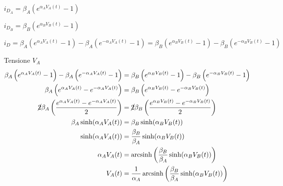 \documentclass[12pt,a4paper,twoside,english,italian]{book}
\DeclareMathOperator{\arcsinh}{arcsinh}
\begin{document}
		$i_{D_{A}} = \beta_{A}\left(e^{\alpha_{A}V_{A}(t)}-1\right)$
		
		$i_{D_{B}} = \beta_{B}\left(e^{\alpha_{B}V_{B}(t)}-1\right)$
		
		$i_{D} = \beta_{A}\left(e^{\alpha_{A}V_{A}(t)}-1\right)-\beta_{A}\left(e^{-\alpha_{A}V_{A}(t)}-1\right) = \beta_{B}\left(e^{\alpha_{B}V_{B}(t)}-1\right)-\beta_{B}\left(e^{-\alpha_{B}V_{B}(t)}-1\right)$
		\pagebreak
		
		Tensione $V_{A}$
		\begin{equation}
			\label{eq:corrente}
			\begin{split}
				\beta_{A}\left(e^{\alpha_{A}V_{A}(t)}-1\right)-\beta_{A}\left(e^{-\alpha_{A}V_{A}(t)}-1\right) &= \beta_{B}\left(e^{\alpha_{B}V_{B}(t)}-1\right)-\beta_{B}\left(e^{-\alpha_{B}V_{B}(t)}-1\right)\\
				\beta_{A}\left(e^{\alpha_{A}V_{A}(t)}-e^{-\alpha_{A}V_{A}(t)}\right) &= \beta_{B}\left(e^{\alpha_{B}V_{B}(t)}-e^{-\alpha_{B}V_{B}(t)}\right)\\
				\cancel{2}\beta_{A}\left(\frac{e^{\alpha_{A}V_{A}(t)}-e^{-\alpha_{A}V_{A}(t)}}{2}\right) &= \cancel{2}\beta_{B}\left(\frac{e^{\alpha_{B}V_{B}(t)}-e^{-\alpha_{B}V_{B}(t)}}{2}\right)\\
				\beta_{A} \sinh(\alpha_{A}V_{A}(t)) &= \beta_{B} \sinh(\alpha_{B}V_{B}(t))\\
				\sinh(\alpha_{A}V_{A}(t)) &= \frac{\beta_{B}}{\beta_{A}} \sinh(\alpha_{B}V_{B}(t))\\
				\alpha_{A}V_{A}(t) &= \arcsinh \left(\frac{\beta_{B}}{\beta_{A}} \sinh(\alpha_{B}V_{B}(t))\right)\\
				V_{A}(t) &= \frac{1}{\alpha_{A}} \arcsinh \left(\frac{\beta_{B}}{\beta_{A}} \sinh(\alpha_{B}V_{B}(t))\right)
			\end{split}
		\end{equation}
		
\end{document}

